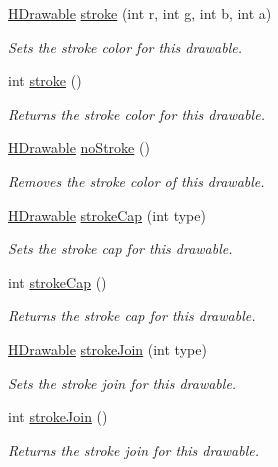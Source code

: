 \begin{DoxyCompactItemize}
\hyperlink{classhype_1_1drawable_1_1_h_drawable}{H\-Drawable} \hyperlink{classhype_1_1drawable_1_1_h_drawable_af93bbe886c7d0b75eaab965d9a4b585c}{stroke} (int r, int g, int b, int a)
\begin{DoxyCompactList}\small\item\em Sets the stroke color for this drawable. \end{DoxyCompactList}\item 
int \hyperlink{classhype_1_1drawable_1_1_h_drawable_a71c0f994e78e4abca14513d48e014ee6}{stroke} ()
\begin{DoxyCompactList}\small\item\em Returns the stroke color for this drawable. \end{DoxyCompactList}\item 
\hyperlink{classhype_1_1drawable_1_1_h_drawable}{H\-Drawable} \hyperlink{classhype_1_1drawable_1_1_h_drawable_a7113d13660848a820f1d7661e16d34e8}{no\-Stroke} ()
\begin{DoxyCompactList}\small\item\em Removes the stroke color of this drawable. \end{DoxyCompactList}\item 
\hyperlink{classhype_1_1drawable_1_1_h_drawable}{H\-Drawable} \hyperlink{classhype_1_1drawable_1_1_h_drawable_a494dc825c3023645aedb917e1817b000}{stroke\-Cap} (int type)
\begin{DoxyCompactList}\small\item\em Sets the stroke cap for this drawable. \end{DoxyCompactList}\item 
int \hyperlink{classhype_1_1drawable_1_1_h_drawable_aa0881e861ef7eda3d2d554d64b63bfa6}{stroke\-Cap} ()
\begin{DoxyCompactList}\small\item\em Returns the stroke cap for this drawable. \end{DoxyCompactList}\item 
\hyperlink{classhype_1_1drawable_1_1_h_drawable}{H\-Drawable} \hyperlink{classhype_1_1drawable_1_1_h_drawable_a0b54f1607c1e0d5366f9f84b1ff0b761}{stroke\-Join} (int type)
\begin{DoxyCompactList}\small\item\em Sets the stroke join for this drawable. \end{DoxyCompactList}\item 
int \hyperlink{classhype_1_1drawable_1_1_h_drawable_aa0f8402fa01dd4a77cb2f46fd869e290}{stroke\-Join} ()
\begin{DoxyCompactList}\small\item\em Returns the stroke join for this drawable. \end{DoxyCompactList}\item 

\end{DoxyCompactItemize}
